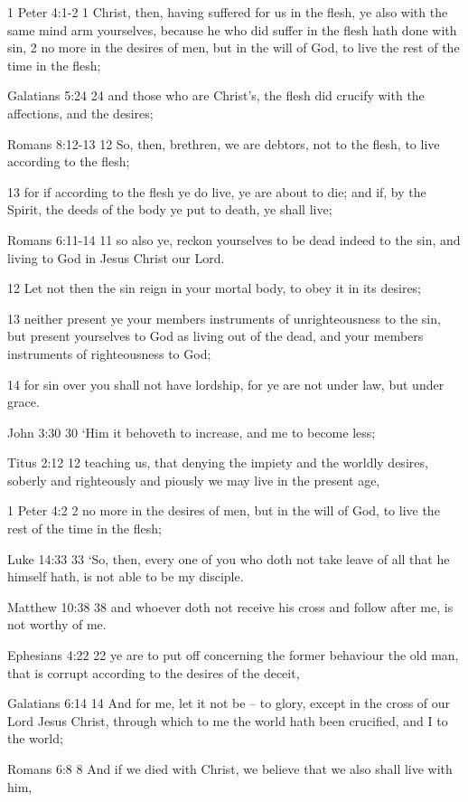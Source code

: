\documentclass[11pt]{article}
\begin{document}
\begin{thebibliography}{37}
1 Peter 4:1-2
1 Christ, then, having suffered for us in the flesh, ye also with the same mind arm yourselves, because he who did suffer in the flesh hath done with sin,
2 no more in the desires of men, but in the will of God, to live the rest of the time in the flesh;

Galatians 5:24
24 and those who are Christ's, the flesh did crucify with the affections, and the desires;

Romans 8:12-13
12 So, then, brethren, we are debtors, not to the flesh, to live according to the flesh;

13 for if according to the flesh ye do live, ye are about to die; and if, by the Spirit, the deeds of the body ye put to death, ye shall live;

Romans 6:11-14
11 so also ye, reckon yourselves to be dead indeed to the sin, and living to God in Jesus Christ our Lord.

12 Let not then the sin reign in your mortal body, to obey it in its desires;

13 neither present ye your members instruments of unrighteousness to the sin, but present yourselves to God as living out of the dead, and your members instruments of righteousness to God;

14 for sin over you shall not have lordship, for ye are not under law, but under grace.


John 3:30
30 `Him it behoveth to increase, and me to become less;

Titus 2:12
12 teaching us, that denying the impiety and the worldly desires, soberly and righteously and piously we may live in the present age,

1 Peter 4:2
2 no more in the desires of men, but in the will of God, to live the rest of the time in the flesh;

Luke 14:33
33 `So, then, every one of you who doth not take leave of all that he himself hath, is not able to be my disciple.

Matthew 10:38
38 and whoever doth not receive his cross and follow after me, is not worthy of me.

Ephesians 4:22
22 ye are to put off concerning the former behaviour the old man, that is corrupt according to the desires of the deceit,

Galatians 6:14
14 And for me, let it not be -- to glory, except in the cross of our Lord Jesus Christ, through which to me the world hath been crucified, and I to the world;

Romans 6:8
8 And if we died with Christ, we believe that we also shall live with him,


\end{thebibliography}
\end{document}
